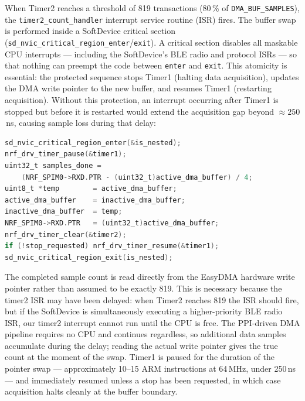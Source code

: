 When Timer2 reaches a threshold of 819 transactions (80\,\% of
\texttt{DMA\_BUF\_SAMPLES}), the \texttt{timer2\_count\_handler} interrupt service
routine (ISR) fires. The
buffer swap is performed inside a SoftDevice critical section
(\texttt{sd\_nvic\_critical\_region\_enter}/\texttt{exit}). A critical section
disables all maskable CPU interrupts --- including the SoftDevice's BLE radio and
protocol ISRs --- so that nothing can preempt the code between \texttt{enter} and
\texttt{exit}. This atomicity is essential: the protected sequence stops Timer1
(halting data acquisition), updates the DMA write pointer to the new buffer, and
resumes Timer1 (restarting acquisition). Without this protection, an interrupt
occurring after Timer1 is stopped but before it is restarted would extend the
acquisition gap beyond $\approx 250$\,ns, causing sample loss during that delay:

\begin{lstlisting}[language=C]
sd_nvic_critical_region_enter(&is_nested);
nrf_drv_timer_pause(&timer1);
uint32_t samples_done =
    (NRF_SPIM0->RXD.PTR - (uint32_t)active_dma_buffer) / 4;
uint8_t *temp        = active_dma_buffer;
active_dma_buffer    = inactive_dma_buffer;
inactive_dma_buffer  = temp;
NRF_SPIM0->RXD.PTR   = (uint32_t)active_dma_buffer;
nrf_drv_timer_clear(&timer2);
if (!stop_requested) nrf_drv_timer_resume(&timer1);
sd_nvic_critical_region_exit(is_nested);
\end{lstlisting}

The completed sample count is read directly from the EasyDMA hardware write
pointer rather than assumed to be exactly 819. This is necessary because the
timer2 ISR may have been delayed: when Timer2 reaches 819 the ISR should fire,
but if the SoftDevice is simultaneously executing a higher-priority BLE radio ISR,
our timer2 interrupt cannot run until the CPU is free. The PPI-driven DMA pipeline
requires no CPU and continues regardless, so additional data samples accumulate
during the delay; reading the actual write pointer gives the true count at the
moment of the swap. Timer1 is paused for the duration of the pointer swap
--- approximately 10--15 ARM instructions at 64\,MHz, under 250\,ns --- and
immediately resumed unless a stop has been requested, in which case acquisition
halts cleanly at the buffer boundary.

